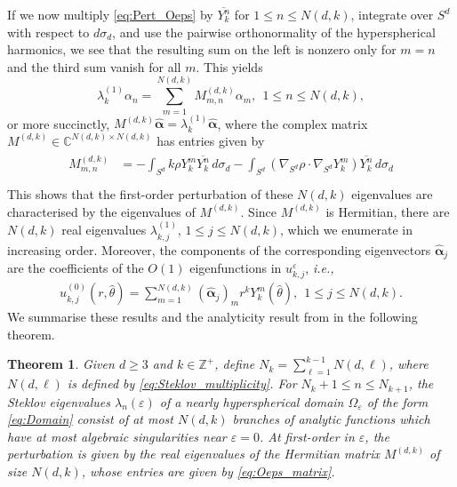 \documentclass[11pt]{amsart}
\theoremstyle{definition}
\theoremstyle{plain}
\newtheorem{theorem}[definition]{Theorem}
\theoremstyle{remark}
\newcommand{\C}{\mathbb{C}}
\newcommand{\Z}{\mathbb{Z}}
\newcommand{\ie}{{\it{i.e.}, }}
\newcommand{\vareps}{\varepsilon}
\newcommand{\del}{\partial}
\renewcommand{\vec}[1]{\hat{\boldsymbol{#1}}}
\newcommand{\cc}{\overline}
\begin{document}
If we now multiply \eqref{eq:Pert_Oeps} by $\cc{Y_k^n}$ for $1\le n\le N(d, k)$, integrate over $S^d$ with respect to $d\sigma_d$, and use the pairwise orthonormality of the hyperspherical harmonics, we see that the resulting sum on the left is nonzero only for $m = n$ and the third sum vanish for all $m$. This yields 
\begin{equation*} 
\lambda_k^{(1)}\alpha_n = \sum_{m = 1}^{N(d, k)} M_{m, n}^{(d, k)}\alpha_m, \ \ 1\le n\le N(d, k), 
\end{equation*} 
or more succinctly, $M^{(d, k)}\vec{\alpha} = \lambda_k^{(1)}\vec{\alpha}$, where the complex matrix $M^{(d, k)}\in\C^{N(d, k)\times N(d, k)}$ has entries given by
\begin{gather} \label{eq:Oeps_matrix}
\begin{aligned}  
M_{m, n}^{(d, k)} & = -\int_{S^d} k\rho Y_k^m\cc{Y_k^n}\, d\sigma_d - \int_{S^d} \left(\nabla_{S^d}\rho\cdot \nabla_{S^d}Y_k^m\right)\cc{Y_k^n}\, d\sigma_d \\ 
\end{aligned} 
\end{gather} 
This shows that the first-order perturbation of these $N(d, k)$ eigenvalues are characterised by the eigenvalues of $M^{(d, k)}$. Since $M^{(d, k)}$ is Hermitian, there are $N(d, k)$ real eigenvalues $\lambda_{k, j}^{(1)}$, $1\le j\le N(d, k)$, which we enumerate in increasing order. Moreover, the components of the corresponding eigenvectors $\vec{\alpha}_j$ are the coefficients of the $O(1)$ eigenfunctions in $u_{k, j}^\vareps$, \ie 
\begin{align*} 
u_{k, j}^{(0)}(r, \hat\theta) = \sum_{m = 1}^{N(d, k)} \left(\vec{\alpha}_j\right)_m r^kY_k^m(\hat\theta), \ \ 1\le j\le N(d, k). 
\end{align*} 
We summarise these results and the analyticity result from \cite{tan2023} in the following theorem. 


\begin{theorem} \label{thm:Oeps_matrix} 
Given $d\ge 3$ and $k\in\Z^+$, define $N_k = \sum_{\ell = 1}^{k - 1} N(d, \ell)$, where $N(d, \ell)$ is defined by \eqref{eq:Steklov_multiplicity}. For $N_k + 1\le n\le N_{k + 1}$, the Steklov eigenvalues $\lambda_n(\vareps)$ of a nearly hyperspherical domain $\Omega_\vareps$ of the form \eqref{eq:Domain} consist of at most $N(d, k)$ branches of analytic functions which have at most algebraic singularities near $\vareps = 0$. At first-order in $\vareps$, the perturbation is given by the real eigenvalues of the Hermitian matrix $M^{(d, k)}$ of size $N(d, k)$, whose entries are given by \eqref{eq:Oeps_matrix}. 
\end{theorem} 
\end{document}
